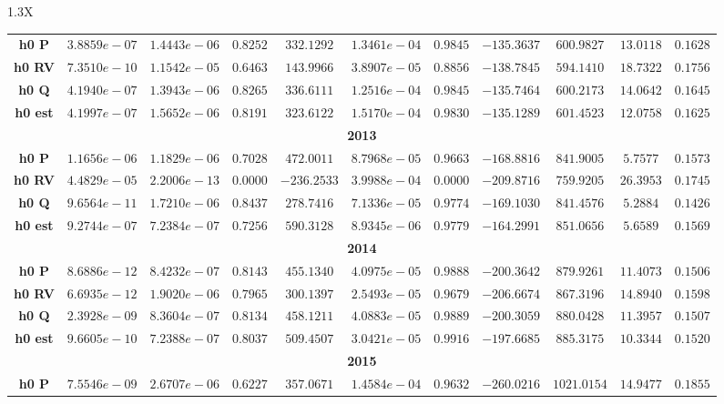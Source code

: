 \documentclass[10pt]{article}
\begin{document}
{\begin{tabularx}{1.3\textwidth}{X}
{\begin{tabular}{ccccccccccc}
\cmidrule(r){1-11} 
 { {\bf h0 P}}& $3.8859e-07$ & $1.4443e-06$ & $0.8252$ & $332.1292$ & $1.3461e-04$ & $0.9845$ & $-135.3637$& $600.9827$& $13.0118$ &$0.1628$\\
 { {\bf h0 RV}}& $7.3510e-10$ & $1.1542e-05$ & $0.6463$ & $143.9966$ & $3.8907e-05$ & $0.8856$ & $-138.7845$& $594.1410$& $18.7322$ &$0.1756$\\
 { {\bf h0 Q}}& $4.1940e-07$ & $1.3943e-06$ & $0.8265$ & $336.6111$ & $1.2516e-04$ & $0.9845$ & $-135.7464$& $600.2173$& $14.0642$ &$0.1645$\\
 { {\bf h0 est}}& $4.1997e-07$ & $1.5652e-06$ & $0.8191$ & $323.6122$ & $1.5170e-04$ & $0.9830$ & $-135.1289$& $601.4523$& $12.0758$ &$0.1625$\\
\bottomrule
\multicolumn{11}{c}{{\bf2013}} \\
\cmidrule(r){1-11} 
 { {\bf h0 P}}& $1.1656e-06$ & $1.1829e-06$ & $0.7028$ & $472.0011$ & $8.7968e-05$ & $0.9663$ & $-168.8816$& $841.9005$& $5.7577$ &$0.1573$\\
 { {\bf h0 RV}}& $4.4829e-05$ & $2.2006e-13$ & $0.0000$ & $-236.2533$ & $3.9988e-04$ & $0.0000$ & $-209.8716$& $759.9205$& $26.3953$ &$0.1745$\\
 { {\bf h0 Q}}& $9.6564e-11$ & $1.7210e-06$ & $0.8437$ & $278.7416$ & $7.1336e-05$ & $0.9774$ & $-169.1030$& $841.4576$& $5.2884$ &$0.1426$\\
 { {\bf h0 est}}& $9.2744e-07$ & $7.2384e-07$ & $0.7256$ & $590.3128$ & $8.9345e-06$ & $0.9779$ & $-164.2991$& $851.0656$& $5.6589$ &$0.1569$\\
\bottomrule
\multicolumn{11}{c}{{\bf2014}} \\
\cmidrule(r){1-11} 
 { {\bf h0 P}}& $8.6886e-12$ & $8.4232e-07$ & $0.8143$ & $455.1340$ & $4.0975e-05$ & $0.9888$ & $-200.3642$& $879.9261$& $11.4073$ &$0.1506$\\
 { {\bf h0 RV}}& $6.6935e-12$ & $1.9020e-06$ & $0.7965$ & $300.1397$ & $2.5493e-05$ & $0.9679$ & $-206.6674$& $867.3196$& $14.8940$ &$0.1598$\\
 { {\bf h0 Q}}& $2.3928e-09$ & $8.3604e-07$ & $0.8134$ & $458.1211$ & $4.0883e-05$ & $0.9889$ & $-200.3059$& $880.0428$& $11.3957$ &$0.1507$\\
 { {\bf h0 est}}& $9.6605e-10$ & $7.2388e-07$ & $0.8037$ & $509.4507$ & $3.0421e-05$ & $0.9916$ & $-197.6685$& $885.3175$& $10.3344$ &$0.1520$\\
\bottomrule
\multicolumn{11}{c}{{\bf2015}} \\
\cmidrule(r){1-11} 
 { {\bf h0 P}}& $7.5546e-09$ & $2.6707e-06$ & $0.6227$ & $357.0671$ & $1.4584e-04$ & $0.9632$ & $-260.0216$& $1021.0154$& $14.9477$ &$0.1855$\\

\end{tabular}}
\end{tabularx}}
\end{document}
